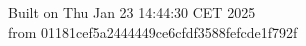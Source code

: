 {\noindent Built on Thu Jan 23 14:44:30 CET 2025} \\ 
 {\noindent from 01181cef5a2444449ce6cfdf3588fefcde1f792f}
